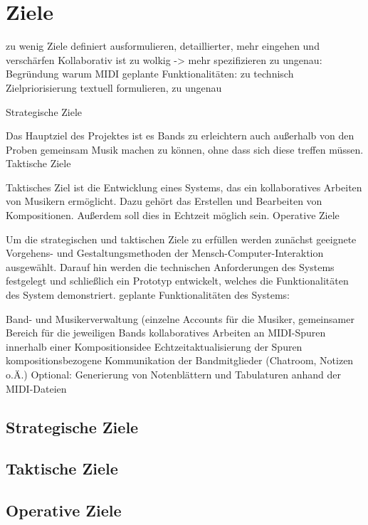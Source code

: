 \documentclass[12pt]{scrartcl}
\begin{document}

\section{Ziele}

zu wenig Ziele definiert
ausformulieren, detaillierter, mehr eingehen und verschärfen
Kollaborativ ist zu wolkig -> mehr spezifizieren
zu ungenau: Begründung warum MIDI
geplante Funktionalitäten: zu technisch
Zielpriorisierung textuell formulieren, zu ungenau

Strategische Ziele

Das Hauptziel des Projektes ist es Bands zu erleichtern auch außerhalb von den Proben gemeinsam Musik machen zu können, ohne dass sich diese treffen müssen.
Taktische Ziele

Taktisches Ziel ist die Entwicklung eines Systems, das ein kollaboratives Arbeiten von Musikern ermöglicht. Dazu gehört das Erstellen und Bearbeiten von Kompositionen. Außerdem soll dies in Echtzeit möglich sein.
Operative Ziele

Um die strategischen und taktischen Ziele zu erfüllen werden zunächst geeignete Vorgehens- und Gestaltungsmethoden der Mensch-Computer-Interaktion ausgewählt. Darauf hin werden die technischen Anforderungen des Systems festgelegt und schließlich ein Prototyp entwickelt, welches die Funktionalitäten des System demonstriert.
geplante Funktionalitäten des Systems:

Band- und Musikerverwaltung (einzelne Accounts für die Musiker, gemeinsamer Bereich für die jeweiligen Bands
kollaboratives Arbeiten an MIDI-Spuren innerhalb einer Kompositionsidee
Echtzeitaktualisierung der Spuren
kompositionsbezogene Kommunikation der Bandmitglieder (Chatroom, Notizen o.Ä.)
Optional: Generierung von Notenblättern und Tabulaturen anhand der MIDI-Dateien



\subsection{Strategische Ziele}

\subsection{Taktische Ziele}

\subsection{Operative Ziele}
\end{document}
